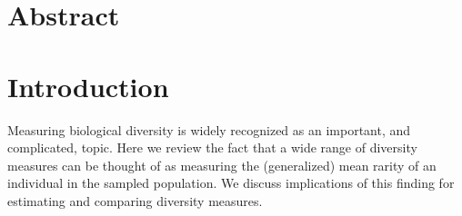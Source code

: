 \documentclass[12pt]{article}
\begin{document}
\section*{Abstract}

\section{Introduction}

Measuring biological diversity is widely recognized as an important, and complicated, topic. Here we review the fact that a wide range of diversity measures can be thought of as measuring the (generalized) mean rarity of an individual in the sampled population. We discuss implications of this finding for estimating and comparing diversity measures.
\end{document}
